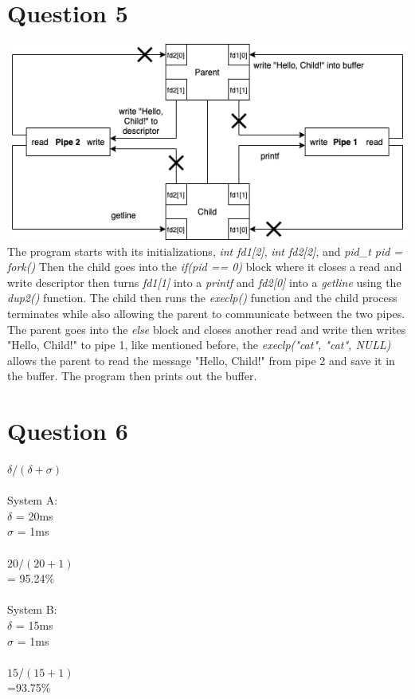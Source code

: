 \documentclass[11pt]{article}
\begin{document}
\section*{Question 5}
\includegraphics[scale=0.4]{COMS352HW2Q5.png}\\
The program starts with its initializations, \emph{int fd1[2]},
\emph{int fd2[2]}, and \emph{pid\_t pid = fork()} Then the child 
goes into the \emph{if(pid == 0)} block where it closes a read and
write descriptor then turns \emph{fd1[1]} into a \emph{printf} and 
\emph{fd2[0]} into 
a \emph{getline} using the \emph{dup2()} function. The child then
runs the \emph{execlp()} function and the child process terminates while
also allowing the parent to communicate between the two pipes.
The parent goes into the \emph{else} block and closes another read
and write then writes "Hello, Child!" to pipe 1, like mentioned before,
the \emph{execlp("cat", "cat", NULL)} allows the parent to read the 
message "Hello, Child!" from pipe 2 and save it in the buffer. The
program then prints out the buffer. 
\section*{Question 6}
    $\delta / (\delta + \sigma)$\\\\
    System A:\\
    $\delta$ = 20ms\\
    $\sigma$ = 1ms\\\\
    $20 / (20 + 1)$\\
    = 95.24\%\\\\
    System B:\\
    $\delta$ = 15ms\\
    $\sigma$ = 1ms\\\\
    $15 / (15 + 1)$\\
    =93.75\%
\end{document}
